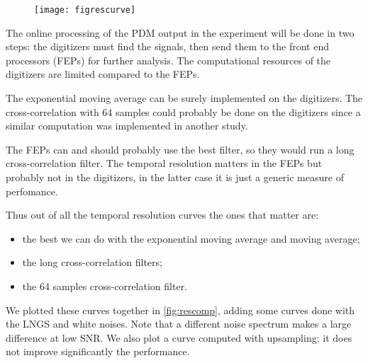 \begin{figure}
    \hspace{-0.09\textwidth}
    \texttt{[image: figrescurve]}
    

\end{figure}

The online processing of the PDM output in the experiment will be done in two
steps: the digitizers must find the signals, then send them to the front end
processors (FEPs) for further analysis. The computational resources of the
digitizers are limited compared to the FEPs.


The exponential moving average can be surely implemented on the digitizers. The
cross-correlation with 64 samples could probably be done on the digitizers
since a similar computation was implemented in another study.

The FEPs can and should probably use the best filter, so they would run a long
cross-correlation filter. The temporal resolution matters in the FEPs but
probably not in the digitizers, in the latter case it is just a generic measure
of perfomance.

Thus out of all the temporal resolution curves the ones that matter are:
%
\begin{itemize}
    \item the best we can do with the exponential moving average and moving
    average;
    \item the long cross-correlation filters;
    \item the 64 samples cross-correlation filter.
\end{itemize}
%
We plotted these curves together in \autoref{fig:rescomp}, adding some
curves done with the LNGS and white noises. Note that a different noise
spectrum makes a large difference at low SNR. We also plot a curve computed
with upsampling; it does not improve significantly the performance.


